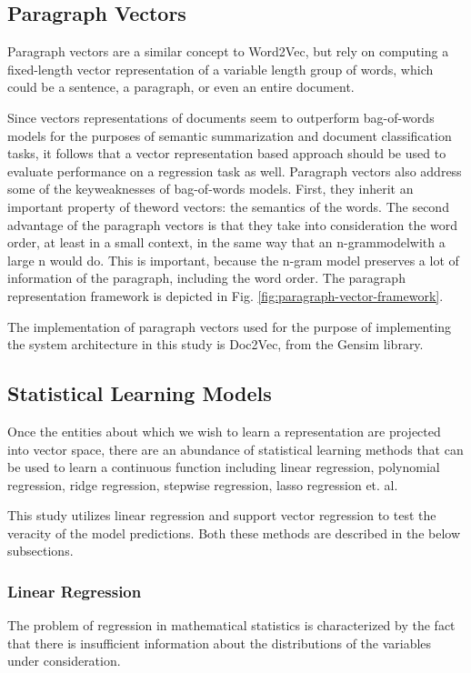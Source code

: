 \documentclass[conference]{IEEEtran}
\begin{document}
\subsection{Paragraph Vectors}
Paragraph vectors are a similar concept to Word2Vec, but rely on computing a fixed-length vector representation of a variable length group of words, which could be a sentence, a paragraph, or even an entire document.

Since vectors representations of documents seem to outperform bag-of-words models for the purposes of semantic summarization and document classification tasks, it follows that a vector representation based approach should be used to evaluate performance on a regression task as well. Paragraph vectors also address some of the keyweaknesses of bag-of-words models. First, they inherit an important property of theword vectors: the semantics of the words. The second advantage of the paragraph vectors is that they take into consideration the word order, at least in a small context, in the same way that an n-grammodelwith a large n would do. This is important, because the n-gram model preserves a lot of information of the paragraph, including the word order\cite{le2014distributed}. The paragraph representation framework is depicted in Fig. \ref{fig:paragraph-vector-framework}.

The implementation of paragraph vectors used for the purpose of implementing the system architecture in this study is Doc2Vec, from the Gensim library\cite{doc2vec_api}.


\subsection{Statistical Learning Models}
Once the entities about which we wish to learn a representation are projected into vector space, there are an abundance of statistical learning methods that can be used to learn a continuous function including linear regression, polynomial regression, ridge regression, stepwise regression, lasso regression et. al.

This study utilizes linear regression and support vector regression to test the veracity of the model predictions. Both these methods are described in the below subsections.

\subsubsection{Linear Regression}
The problem of regression in mathematical statistics is characterized by the fact that there is insufficient information about the distributions of the variables under consideration\cite{regression_analysis}.
\end{document}
